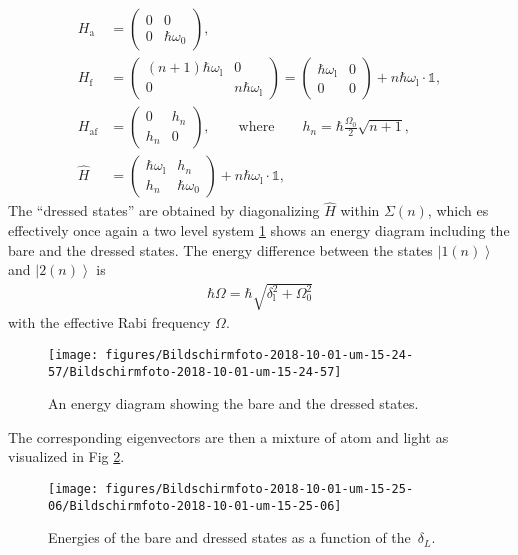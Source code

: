 \documentclass[10pt]{article}
\newcommand{\ket}[1]{\ensuremath{\left|#1\right\rangle}}
\begin{document}
\begin{align}
H_\textrm{a} &= \left( \begin{array}{cc} 0 & 0 \\ 0 & \hbar \omega_0 \end{array} \right),\\
H_\textrm{f} &= \left( \begin{array}{cc} (n+1)\hbar \omega_\textrm{l} & 0 \\ 0 & n \hbar \omega_\textrm{l} \end{array} \right) =  \left( \begin{array}{cc} \hbar \omega_\textrm{l} & 0 \\ 0 & 0 \end{array} \right) + n \hbar \omega_\textrm{l} \cdot \mathbb{1},\\
H_\textrm{af} &= \left( \begin{array}{cc} 0 & h_n \\ h_n & 0 \end{array} \right), \qquad \text{where} \qquad h_n = \hbar \frac{\Omega_0}{2}\sqrt{n+1},\\
\hat{H} &= \left( \begin{array}{cc} \hbar \omega_\textrm{l} & h_n \\ h_n & \hbar \omega_0 \end{array} \right) + n \hbar \omega_\textrm{l} \cdot \mathbb{1},
\end{align}
The ``dressed states'' are obtained by diagonalizing $\hat{H}$ within $\Sigma(n)$, which es effectively once again a two level system \ref{180224} shows an energy diagram including the bare and the dressed states. The energy difference between the states $\ket{1(n)}$ and $\ket{2(n)}$ is 
\begin{align}
\hbar \Omega = \hbar \sqrt{\delta_\textrm{l}^2 + \Omega_0^2}
\end{align}
with the effective Rabi frequency $\Omega$.
\begin{figure}[h!]
\begin{center}
\texttt{[image: figures/Bildschirmfoto-2018-10-01-um-15-24-57/Bildschirmfoto-2018-10-01-um-15-24-57]}
\caption{{An energy diagram showing the bare and the dressed states.
{\label{180224}}%
}}
\end{center}
\end{figure}

The corresponding eigenvectors are then a mixture of atom and light as visualized in Fig \ref{633447}.
\begin{figure}[h!]
\begin{center}
\texttt{[image: figures/Bildschirmfoto-2018-10-01-um-15-25-06/Bildschirmfoto-2018-10-01-um-15-25-06]}
\caption{{Energies of the bare and dressed states as a function of
the~\(\delta_L\).
{\label{633447}}%
}}
\end{center}
\end{figure}
\end{document}
